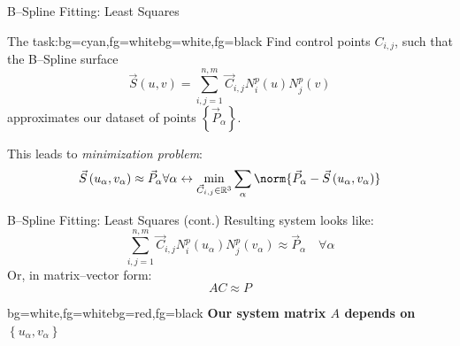 \begin{frame}{B--Spline Fitting: Least Squares}
\begin{variableblock}{The task:}{bg=cyan,fg=white}{bg=white,fg=black}
{
Find control points $C_{i,j}$, such that the B--Spline surface
\begin{equation*}
\vec{S}\left(u,v\right)=\sum\limits_{i,j=1}^{n,m} \vec{C}_{i,j} N_i^p\left(u\right) N_j^p\left(v\right)
\end{equation*}
approximates our dataset of points $\left\lbrace \vec{P}_{\alpha} \right\rbrace $. 
}
\end{variableblock}

This leads to \textit{minimization problem}:
\begin{equation*}
\vec{S}\left(u_\alpha,v_\alpha\right) \approx \vec{P}_{\alpha} \forall \alpha \leftrightarrow 
\underset{\vec{C}_{i,j}\in \mathbb{R}^3}{\min} \sum\limits_\alpha \norm{\vec{P}_{\alpha}-\vec{S}\left(u_\alpha,v_\alpha\right)}
\end{equation*}
\end{frame}

\begin{frame}{B--Spline Fitting: Least Squares (cont.)}
Resulting system looks like:
\begin{equation*}
\sum\limits_{i,j=1}^{n,m} \vec{C}_{i,j} N_i^p\left(u_\alpha\right) N_j^p\left(v_\alpha\right) \approx \vec{P}_{\alpha} \quad \forall \alpha
\end{equation*}
Or, in matrix--vector form:
\begin{equation*}
A C \approx P
\end{equation*}


\begin{variableblock}{}{bg=white,fg=white}{bg=red,fg=black}
{
\textbf{
Our system matrix $A$ depends on $\left\lbrace u_\alpha,v_\alpha \right\rbrace$}
}
\end{variableblock}

\end{frame}

